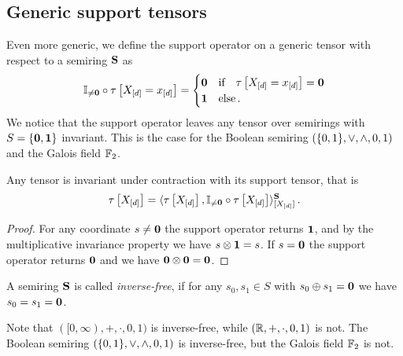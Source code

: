 \subsection{Generic support tensors}

Even more generic, we define the support operator on a generic tensor with respect to a semiring $\mathbf{S}$ as
\begin{align*}
    \mathbb{I}_{\neq\mathbf{0}}\circ\tau\left[X_{[d]}=x_{[d]}\right]
    = \begin{cases}
          \mathbf{0} & \text{if}\quad \tau\left[X_{[d]}=x_{[d]}\right] = \mathbf{0} \\
          \mathbf{1} & \text{else} \, .
    \end{cases}
\end{align*}
We notice that the support operator leaves any tensor over semirings with $S=\{\mathbf{0},\mathbf{1}\}$ invariant.
This is the case for the Boolean semiring $(\{0,1\},\lor,\land,0,1)$ and the Galois field $\mathbb{F}_2$.

\begin{lemma}\label{lem:supportInvarianceGeneric}
    Any tensor is invariant under contraction with its support tensor, that is
    \begin{align*}
        \tau\left[X_{[d]}\right]
        = \langle
            \tau\left[X_{[d]}\right],\mathbb{I}_{\neq\mathbf{0}}\circ\tau\left[X_{[d]}\right]
        \rangle^{\mathbf{S}}_{[X_{[d]}]} \, .
    \end{align*}
\end{lemma}
\begin{proof}
    For any coordinate $s\neq\mathbf{0}$ the support operator returns $\mathbf{1}$, and by the multiplicative invariance property we have $s \otimes \mathbf{1} = s$.
    If $s=\mathbf{0}$ the support operator returns $\mathbf{0}$ and we have $\mathbf{0}\otimes\mathbf{0}=\mathbf{0}$.
\end{proof}

\begin{definition}
    A semiring $\mathbf{S}$ is called \emph{inverse-free}, if for any $s_0,s_1\in S$ with $s_0\oplus s_1=\mathbf{0}$ we have $s_0=s_1=\mathbf{0}$.
\end{definition}

Note that $([0,\infty),+,\cdot,0,1)$ is inverse-free, while $(\mathbb{R},+,\cdot,0,1)$ is not.
The Boolean semiring $(\{0,1\},\lor,\land,0,1)$ is inverse-free, but the Galois field $\mathbb{F}_2$ is not.

